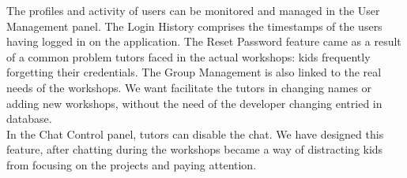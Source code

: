 The profiles and activity of users can be monitored and managed in the User Management panel. The Login History comprises the timestamps of the users having logged in on the application. The Reset Password feature came as a result of a common problem tutors faced in the actual workshops: kids frequently forgetting their credentials. The Group Management is also linked to the real needs of the workshops. We want facilitate the tutors in changing names or adding new workshops, without the need of the developer changing entried in database. \\

In the Chat Control panel, tutors can disable the chat. We have designed this feature, after chatting during the workshops became a way of distracting kids from focusing on the projects and paying attention.






















